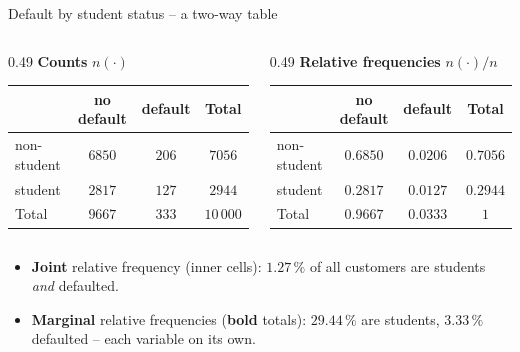 \documentclass[aspectratio=169,11pt]{beamer}
\begin{document}
\begin{frame}{Default by student status -- a two-way table}
  \begin{columns}[T]
    \begin{column}{0.49\textwidth}
      \centering
      \textbf{Counts} $n(\cdot)$\\[2pt]
      \renewcommand{\arraystretch}{1.15}
      \begin{tabular}{@{}l|cc|c@{}}
        \toprule
        & no default & default & Total\\
        \midrule
        non-student & $6850$ & $206$ & $7056$\\
        student & $2817$ & $127$ & $2944$\\
        \midrule
        Total & $9667$ & $333$ & $10\,000$\\
        \bottomrule
      \end{tabular}
    \end{column}
    \begin{column}{0.49\textwidth}
      \centering
      \textbf{Relative frequencies} $n(\cdot)/n$\\[2pt]
      \renewcommand{\arraystretch}{1.15}
      \begin{tabular}{@{}l|cc|c@{}}
        \toprule
        & no default & default & Total\\
        \midrule
        non-student & $0.6850$ & $0.0206$ & $\mathbf{0.7056}$\\
        student & $0.2817$ & \textcolor{hsbiorange!85!black}{$\mathbf{0.0127}$} & $\mathbf{0.2944}$\\
        \midrule
        Total & $\mathbf{0.9667}$ & $\mathbf{0.0333}$ & $1$\\
        \bottomrule
      \end{tabular}
    \end{column}
  \end{columns}
  \medskip
  \begin{itemize}\setlength{\itemsep}{2pt}
    \item \textbf{Joint} relative frequency (inner cells): \textcolor{hsbiorange!85!black}{$1.27\,\%$}
          of all customers are students \emph{and} defaulted.
    \item \textbf{Marginal} relative frequencies (\textbf{bold} totals): $29.44\,\%$
          are students, $3.33\,\%$ defaulted -- each variable on its own.
  \end{itemize}
\end{frame}
\end{document}
